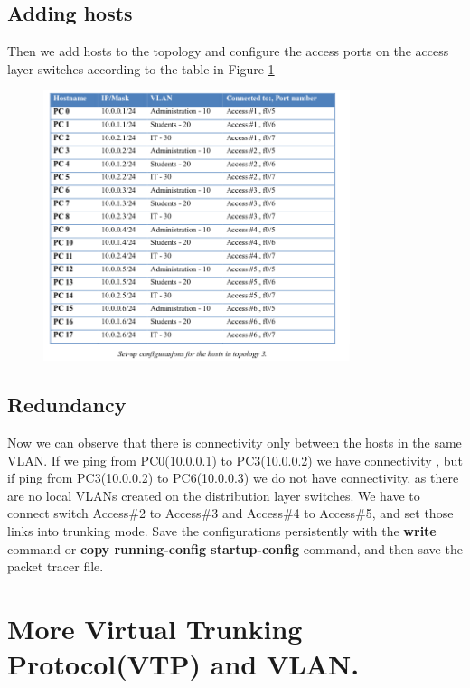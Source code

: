 \documentclass{article}
\begin{document}
\subsection{Adding hosts}

Then we add hosts to the topology and configure the access ports on the access layer switches according to the table in Figure \ref{fig:tabletop}

\begin{figure}[!h]
    \centering
    \includegraphics[scale=0.6,width=0.8\textwidth]{3tabletop}
    \caption{}
    \label{fig:tabletop}
\end{figure}

\subsection{Redundancy}

Now we can observe that there is connectivity only between the hosts in the same VLAN. If we ping from PC0(10.0.0.1) to PC3(10.0.0.2) we have connectivity , but if ping from PC3(10.0.0.2) to PC6(10.0.0.3) we do not have connectivity, as there are no local VLANs created on the distribution layer switches. We have to connect switch Access\#2 to Access\#3 and Access\#4 to Access\#5, and set those links into trunking mode. Save the configurations persistently with the \textbf{write} command or \textbf{copy running-config startup-config} command,  and then save the packet tracer file.


\section{More Virtual Trunking Protocol(VTP) and VLAN.}
\end{document}
